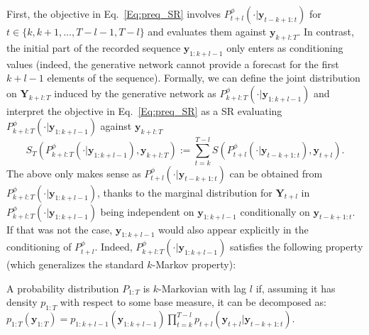 \documentclass[twoside,11pt]{article}
\newcommand{\ddobs}{\mathbf{y}}
\newcommand{\Ddobs}{\mathbf{Y}}
\newcommand{\ddobsupT}{\mathbf{y}_{1:T}}
\begin{document}
	First, the objective in Eq.~\eqref{Eq:preq_SR} involves $ P^\phi_{t+l}(\cdot|\ddobs_{t-k+1:t}) $ for $ t\in\{k, k+1, \ldots, T-l-1, T-l\} $ and evaluates them against $ \ddobs_{k+l:T} $. In contrast, the initial part of the recorded sequence $ \ddobs_{1:k+l-1} $ only enters as conditioning values (indeed, the generative network cannot provide a forecast for the first $ k+l-1 $ elements of the sequence). Formally, we can define the joint distribution on $ \Ddobs_{k+l:T} $ induced by the generative network as $P^\phi_{k+l:T}(\cdot|\ddobs_{1:k+l-1}) $ and interpret the objective in Eq.~\eqref{Eq:preq_SR} as a SR evaluating $P^\phi_{k+l:T}(\cdot|\ddobs_{1:k+l-1}) $ against $ \ddobs_{k+l:T} $
	\begin{equation}\label{Eq:ST_def}
	S_T (P^\phi_{k+l:T}(\cdot|\ddobs_{1:k+l-1}), \ddobs_{k+l:T}):= \sum\limits_{t=k}^{T-l}S(P^\phi_{t+l}(\cdot|\ddobs_{t-k+1:t}),\ddobs_{t+l}).
	\end{equation}
	The above only makes sense as $ P^\phi_{t+l}(\cdot|\ddobs_{t-k+1:t}) $ can be obtained from $ P^\phi_{k+l:T}(\cdot|\ddobs_{1:k+l-1}) $, thanks to the marginal distribution for $ \Ddobs_{t+l} $ in $ P^\phi_{k+l:T}(\cdot|\ddobs_{1:k+l-1}) $ %
	being independent on $ \ddobs_{1:k+l-1} $ conditionally on $ \ddobs_{t-k+1:t} $. If that was not the case, $ \ddobs_{1:k+l-1} $ would also appear explicitly in the conditioning of $ P^\phi_{t+l} $. Indeed, $ P^\phi_{k+l:T}(\cdot|\ddobs_{1:k+l-1}) $ satisfies the following property (which generalizes the standard $ k $-Markov property):
	\begin{definition}
		A probability distribution $ P_{1:T} $ is $ k $-Markovian with lag $ l $ if, assuming it has density $ p_{1:T} $ with respect to some base measure, it can be decomposed as: 
		$ 	p_{1:T}(\ddobs_{1:T}) = p_{1:k+l-1}(\ddobs_{1:k+l-1})\prod_{t=k}^{T-l}p_{t+l}(\ddobs_{t+l}|\ddobs_{{t-k+1}:t}).
		$%
	\end{definition}
	
\end{document}

